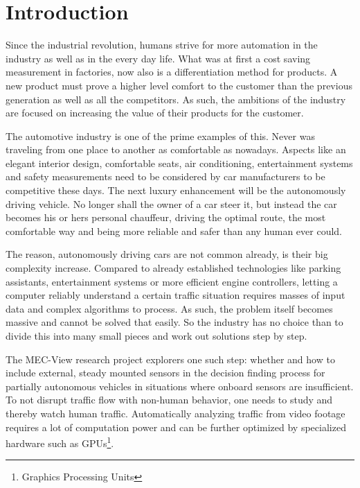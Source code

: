 \chapter{Introduction}

Since the industrial revolution, humans strive for more automation in the industry as well as in the every day life.
What was at first a cost saving measurement in factories, now also is a differentiation method for products.
A new product must prove a higher level comfort to the customer than the previous generation as well as all the competitors.
As such, the ambitions of the industry are focused on increasing the value of their products for the customer.

The automotive industry is one of the prime examples of this.
Never was traveling from one place to another as comfortable as nowadays.
Aspects like an elegant interior design, comfortable seats, air conditioning, entertainment systems and safety measurements need to be considered by car manufacturers to be competitive these days. 
The next luxury enhancement will be the autonomously driving vehicle.
No longer shall the owner of a car steer it, but instead the car becomes his or hers personal chauffeur, driving the optimal route, the most comfortable way and being more reliable and safer than any human ever could.

The reason, autonomously driving cars are not common already, is their big complexity increase.
Compared to already established technologies like parking assistants, entertainment systems or more efficient engine controllers, letting a computer reliably understand a certain traffic situation requires masses of input data and complex algorithms to process.
As such, the problem itself becomes massive and cannot be solved that easily.
So the industry has no choice than to divide this into many small pieces and work out solutions step by step.

The MEC-View research project explorers one such step: whether and how to include external, steady mounted sensors in the decision finding process for partially autonomous vehicles in situations where onboard sensors are insufficient.
To not disrupt traffic flow with non-human behavior, one needs to study and thereby watch human traffic.
Automatically analyzing traffic from video footage requires a lot of computation power and can be further optimized by specialized hardware such as GPUs\footnote{Graphics Processing Units}.

